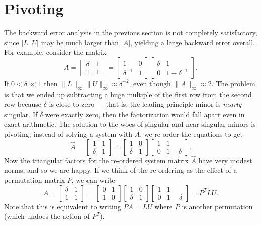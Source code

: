 \section{Pivoting}

The backward error analysis in the previous section is not completely
satisfactory, since $|L| |U|$ may be much larger than $|A|$, yielding
a large backward error overall.  For example, consider the matrix
\[
  A = \begin{bmatrix} \delta & 1 \\ 1 & 1 \end{bmatrix} =
      \begin{bmatrix} 1 & 0 \\ \delta^{-1} & 1 \end{bmatrix}
      \begin{bmatrix} \delta & 1 \\ 0 & 1-\delta^{-1} \end{bmatrix}.
\]
If $0 < \delta \ll 1$ then $\|L\|_{\infty} \|U\|_{\infty} \approx
\delta^{-2}$, even though $\|A\|_{\infty} \approx 2$.  The problem is
that we ended up subtracting a huge multiple of the first row from the
second row because $\delta$ is close to zero --- that is, the leading
principle minor is {\em nearly} singular.  If $\delta$ were exactly
zero, then the factorization would fall apart even in exact
arithmetic.  The solution to the woes of singular and near singular minors
is pivoting; instead of solving a system with $A$, we re-order the
equations to get
\[
  \hat{A} =
      \begin{bmatrix} 1 & 1 \\ \delta & 1 \end{bmatrix} =
      \begin{bmatrix} 1 & 0 \\ \delta & 1 \end{bmatrix}
      \begin{bmatrix} 1 & 1 \\ 0 & 1-\delta \end{bmatrix}.
\]
Now the triangular factors for the re-ordered system matrix $\hat{A}$
have very modest norms, and so we are happy.  If we think of the re-ordering
as the effect of a permutation matrix $P$, we can write
\[
  A = \begin{bmatrix} \delta & 1 \\ 1 & 1 \end{bmatrix} =
      \begin{bmatrix} 0 & 1 \\ 1 & 0 \end{bmatrix}
      \begin{bmatrix} 1 & 0 \\ \delta & 1 \end{bmatrix}
      \begin{bmatrix} 1 & 1 \\ 0 & 1-\delta \end{bmatrix}
    = P^T LU.
\]
Note that this is equivalent to writing $P A = LU$ where $P$
is another permutation (which undoes the action of $P^T$).

